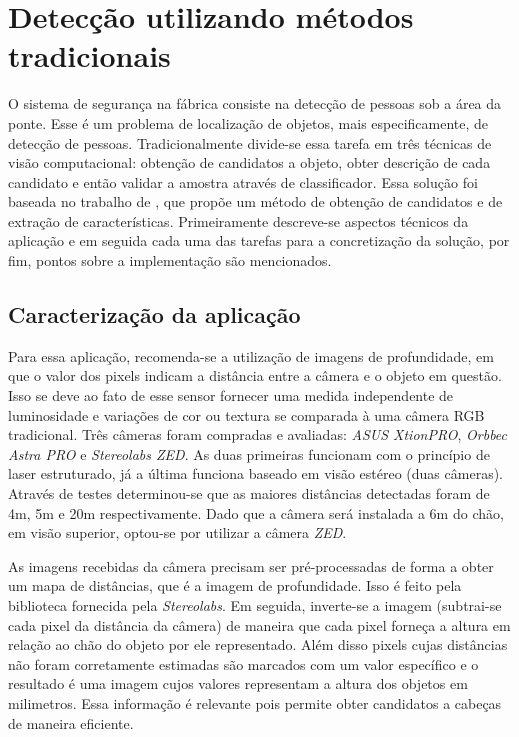 \chapter{Detecção utilizando métodos tradicionais} \label{chap:tradicional}

O sistema de segurança na fábrica consiste na detecção de pessoas sob a área da ponte. Esse é um problema de localização de objetos, mais especificamente, de detecção de pessoas. Tradicionalmente divide-se essa tarefa em três técnicas de visão computacional: obtenção de candidatos a objeto, obter descrição de cada candidato e então validar a amostra através de classificador. Essa solução foi baseada no trabalho de \cite{rauter}, que propõe um método de obtenção de candidatos e de extração de características. Primeiramente descreve-se aspectos técnicos da aplicação e em seguida cada uma das tarefas para a concretização da solução, por fim, pontos sobre a implementação são mencionados.

\section{Caracterização da aplicação}
Para essa aplicação, recomenda-se a utilização de imagens de profundidade, em que o valor dos pixels indicam a distância entre a câmera e o objeto em questão. Isso se deve ao fato de esse sensor fornecer uma medida independente de luminosidade e variações de cor ou textura se comparada à uma câmera RGB tradicional. Três câmeras foram compradas e avaliadas: \textit{ASUS XtionPRO}, \textit{Orbbec Astra PRO} e \textit{Stereolabs ZED}. As duas primeiras funcionam com o princípio de laser estruturado, já a última funciona baseado em visão estéreo (duas câmeras). Através de testes determinou-se que as maiores distâncias detectadas foram de 4m, 5m e 20m respectivamente. Dado que a câmera será instalada a 6m do chão, em visão superior, optou-se por utilizar a câmera \textit{ZED}.

As imagens recebidas da câmera precisam ser pré-processadas de forma a obter um mapa de distâncias, que é a imagem de profundidade. Isso é feito pela biblioteca fornecida pela \textit{Stereolabs}. Em seguida, inverte-se a imagem (subtrai-se cada pixel da distância da câmera) de maneira que cada pixel forneça a altura em relação ao chão do objeto por ele representado. Além disso pixels cujas distâncias não foram corretamente estimadas são marcados com um valor específico e o resultado é uma imagem cujos valores representam a altura dos objetos em milimetros. Essa informação é relevante pois permite obter candidatos a cabeças de maneira eficiente.

